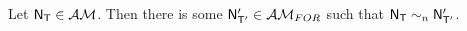 
\begin{thm} \label{approximatingEventModel}
Let $\evM_\evT \in \eventClass$.
Then there is some $\evM'_{\evT'} \in \forestClass$ such that $\evM_\evT \sim_n \evM'_{\evT'}$.
\end{thm}

